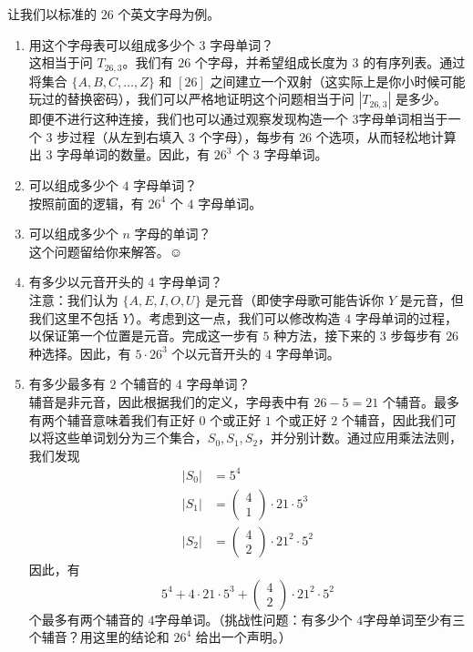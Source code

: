 \begin{example}
    让我们以标准的 $26$ 个英文字母为例。
    \begin{enumerate}
        \item 用这个字母表可以组成多少个 $3$ 字母单词？\\
              这相当于问 $T_{26,3}$。我们有 $26$ 个字母，并希望组成长度为 $3$ 的有序列表。通过将集合 $\{A, B, C, \dots , Z\}$ 和 $[26]$ 之间建立一个双射（这实际上是你小时候可能玩过的替换密码），我们可以严格地证明这个问题相当于问 $|T_{26,3}|$ 是多少。\\

              即便不进行这种连接，我们也可以通过观察发现构造一个 $3$字母单词相当于一个 $3$ 步过程（从左到右填入 $3$ 个字母），每步有 $26$ 个选项，从而轻松地计算出 $3$ 字母单词的数量。因此，有 $26^3$ 个 $3$ 字母单词。
        \item 可以组成多少个 $4$ 字母单词？\\
              按照前面的逻辑，有 $26^4$ 个 $4$ 字母单词。
        \item 可以组成多少个 $n$ 字母的单词？\\
              这个问题留给你来解答。$\smiley{}$
        \item 有多少以元音开头的 $4$ 字母单词？\\
              注意：我们认为 $\{A,E,I,O,U\}$ 是元音（即使字母歌可能告诉你 $Y$ 是元音，但我们这里不包括 $Y$）。考虑到这一点，我们可以修改构造 $4$ 字母单词的过程，以保证第一个位置是元音。完成这一步有 $5$ 种方法，接下来的 $3$ 步每步有 $26$种选择。因此，有 $5 \cdot 26^3$ 个以元音开头的 $4$ 字母单词。
        \item 有多少最多有 $2$ 个辅音的 $4$ 字母单词？\\
              辅音是非元音，因此根据我们的定义，字母表中有 $26 - 5 = 21$ 个辅音。最多有两个辅音意味着我们有正好 $0$ 个或正好 $1$ 个或正好 $2$ 个辅音，因此我们可以将这些单词划分为三个集合，$S_0, S_1, S_2$，并分别计数。通过应用乘法法则，我们发现
              \begin{align*}
                  |S_0| & = 5^4                                                     \\
                  |S_1| & = \begin{pmatrix} 4\\1 \end{pmatrix} \cdot 21 \cdot 5^3   \\
                  |S_2| & = \begin{pmatrix} 4\\2 \end{pmatrix} \cdot 21^2 \cdot 5^2
              \end{align*}
              因此，有
              \[5^4 +  4 \cdot 21 \cdot 5^3 + \begin{pmatrix} 4\\2 \end{pmatrix} \cdot 21^2 \cdot 5^2\]
              个最多有两个辅音的 $4$字母单词。（挑战性问题：有多少个 $4$字母单词至少有三个辅音？用这里的结论和 $26^4$ 给出一个声明。）\\


\end{enumerate}
\end{example}

